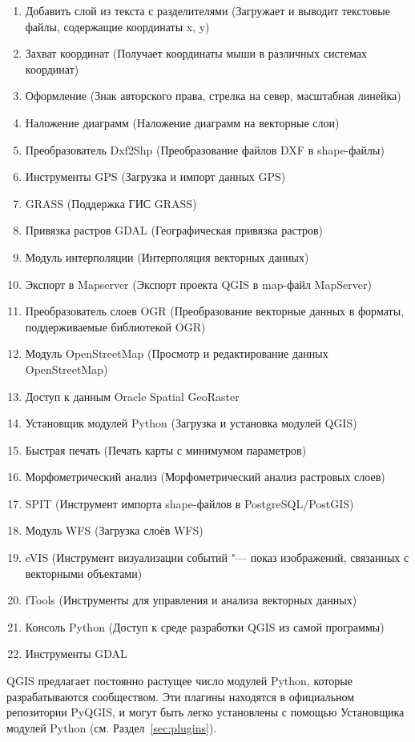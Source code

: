 \begin{enumerate}
\item Добавить слой из текста с разделителями (Загружает и выводит
текстовые файлы, содержащие координаты x, y)
\item Захват координат (Получает координаты мыши в различных системах
координат)
\item Оформление (Знак авторского права, стрелка на север, масштабная
линейка)
\item Наложение диаграмм (Наложение диаграмм на векторные слои)
\item Преобразователь Dxf2Shp (Преобразование файлов DXF в shape-файлы)
\item Инструменты GPS (Загрузка и импорт данных GPS)
\item GRASS (Поддержка ГИС GRASS)
\item Привязка растров GDAL (Географическая привязка растров)
\item Модуль интерполяции (Интерполяция векторных данных)
\item Экспорт в Mapserver (Экспорт проекта QGIS в map-файл MapServer)
\item Преобразователь слоев OGR (Преобразование векторные данных в форматы,
поддерживаемые библиотекой OGR)
\item Модуль OpenStreetMap (Просмотр и редактирование данных
OpenStreetMap)
\item Доступ к данным Oracle Spatial GeoRaster
\item Установщик модулей Python (Загрузка и установка модулей QGIS)
\item Быстрая печать (Печать карты с минимумом параметров)
\item Морфометрический анализ (Морфометрический анализ растровых слоев)
\item SPIT (Инструмент импорта shape-файлов в PostgreSQL/PostGIS)
\item Модуль WFS (Загрузка слоёв WFS)
\item eVIS (Инструмент визуализации событий "--- показ изображений, связанных
с векторными объектами)
\item fTools (Инструменты для управления и анализа векторных данных)
\item Консоль Python (Доступ к среде разработки QGIS из самой программы)
\item Инструменты GDAL
\end{enumerate}


QGIS предлагает постоянно растущее число модулей Python, которые
разрабатываются сообществом. Эти плагины находятся в официальном
репозитории PyQGIS, и могут быть легко установлены с помощью Установщика
модулей Python (см. Раздел~\ref{sec:plugins}).

